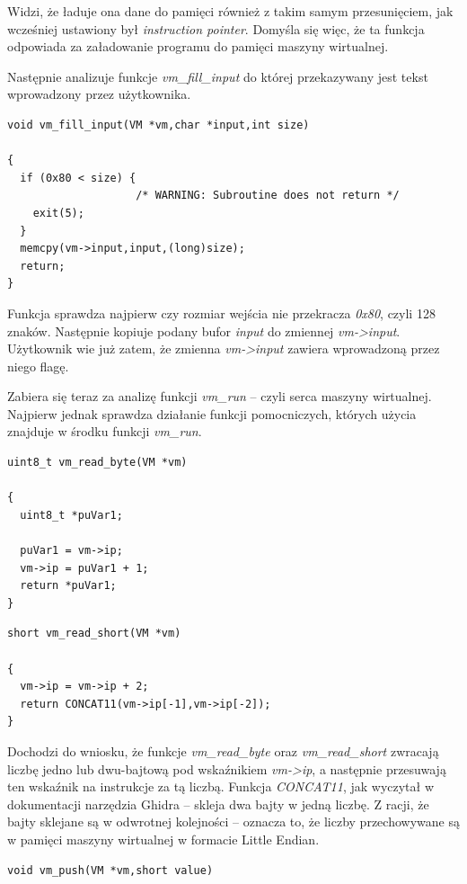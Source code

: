 \documentclass[language=polish,type=eng]{aghmodern}
\begin{document}
\begin{appendices}
Widzi, że ładuje ona dane do pamięci również z takim samym przesunięciem, jak wcześniej
ustawiony był \emph{instruction pointer}. Domyśla się więc, że ta funkcja odpowiada za
załadowanie programu do pamięci maszyny wirtualnej.

Następnie analizuje funkcje \emph{vm\_fill\_input} do której przekazywany jest tekst
wprowadzony przez użytkownika.

\begin{verbatim}
void vm_fill_input(VM *vm,char *input,int size)

{
  if (0x80 < size) {
                    /* WARNING: Subroutine does not return */
    exit(5);
  }
  memcpy(vm->input,input,(long)size);
  return;
}
\end{verbatim}

Funkcja sprawdza najpierw czy rozmiar wejścia nie przekracza \emph{0x80}, czyli 128 znaków.
Następnie kopiuje podany bufor \emph{input} do zmiennej \emph{vm->input}.
Użytkownik wie już zatem, że zmienna \emph{vm->input} zawiera wprowadzoną przez niego flagę.

Zabiera się teraz za analizę funkcji \emph{vm\_run} -- czyli serca maszyny wirtualnej.
Najpierw jednak sprawdza działanie funkcji pomocniczych, których użycia znajduje w środku
funkcji \emph{vm\_run}.

\begin{verbatim}
uint8_t vm_read_byte(VM *vm)

{
  uint8_t *puVar1;
  
  puVar1 = vm->ip;
  vm->ip = puVar1 + 1;
  return *puVar1;
}
\end{verbatim}

\begin{verbatim}
short vm_read_short(VM *vm)

{
  vm->ip = vm->ip + 2;
  return CONCAT11(vm->ip[-1],vm->ip[-2]);
}
\end{verbatim}

Dochodzi do wniosku, że funkcje \emph{vm\_read\_byte} oraz \emph{vm\_read\_short}
zwracają liczbę jedno lub dwu-bajtową pod wskaźnikiem \emph{vm->ip},
a następnie przesuwają ten wskaźnik na instrukcje za tą liczbą.
Funkcja \emph{CONCAT11}, jak wyczytał w dokumentacji narzędzia Ghidra -- skleja
dwa bajty w jedną liczbę. Z racji, że bajty sklejane są w odwrotnej kolejności --
oznacza to, że liczby przechowywane są w pamięci maszyny wirtualnej w formacie Little Endian.

\begin{verbatim}
void vm_push(VM *vm,short value)


\end{verbatim}
\end{appendices}
\end{document}
